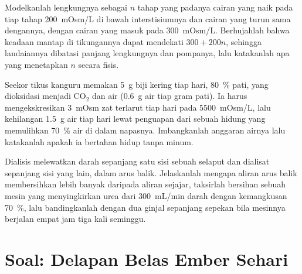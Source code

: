 \begin{exercise}[$\star\star\star$]\label{exo:b3:renal-osmoregulation:10}
Modelkanlah lengkungnya sebagai $n$ tahap yang padanya cairan yang naik pada tiap
tahap \qty{200}{mOsm/L} di bawah interstisiumnya dan cairan yang turun
sama dengannya, dengan cairan yang masuk pada \qty{300}{mOsm/L}. Berhujahlah
bahwa  keadaan mantap di tikungannya dapat mendekati $300 +
200n$, sehingga landaiannya dibatasi panjang lengkungnya dan
 pompanya, lalu katakanlah apa yang menetapkan $n$ secara fisis.
\end{exercise}

\begin{exercise}[$\star\star\star$]\label{exo:b3:renal-osmoregulation:11}
Seekor tikus kanguru memakan \qty{5}{g} biji kering tiap hari, \qty{80}{\%} pati,
yang dioksidasi menjadi CO$_{2}$ dan air (\qty{0.6}{g} air tiap gram pati).
Ia harus mengekskresikan \qty{3}{mOsm} zat terlarut tiap hari pada \qty{5500}{mOsm/L},
lalu kehilangan \qty{1.5}{g} air tiap hari lewat penguapan dari sebuah hidung yang
memulihkan \qty{70}{\%} air di dalam napasnya. Imbangkanlah anggaran airnya lalu
katakanlah apakah ia bertahan hidup tanpa minum.
\end{exercise}

\begin{exercise}[$\star\star\star$]\label{exo:b3:renal-osmoregulation:12}
Dialisis melewatkan darah sepanjang satu sisi sebuah selaput dan dialisat sepanjang
sisi yang lain, dalam arus balik. Jelaskanlah mengapa aliran arus balik membersihkan
lebih banyak daripada aliran sejajar, taksirlah bersihan sebuah mesin yang
menyingkirkan urea dari \qty{300}{mL/min} darah dengan kemangkusan \qty{70}{\%},
lalu bandingkanlah dengan dua ginjal sepanjang sepekan bila mesinnya
berjalan empat jam tiga kali seminggu.
\end{exercise}

\section{Soal: Delapan Belas Ember Sehari}


